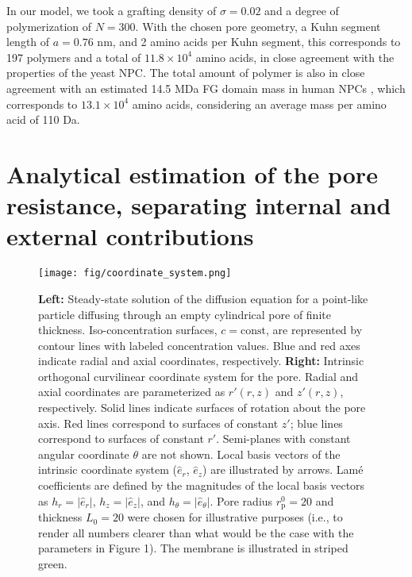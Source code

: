 \documentclass[10pt, a4paper, twocolumn]{article}
\begin{document}
In our model, we took a grafting density of $\sigma = 0.02$ and a degree of polymerization of $N = 300$.
With the chosen pore geometry, a Kuhn segment length of $a = 0.76$ nm, and 2 amino acids per Kuhn segment, this corresponds to 197 polymers and a total of $11.8 \times 10^4$ amino acids, in close agreement with the properties of the yeast NPC.
The total amount of polymer is also in close agreement with an estimated 14.5 MDa FG domain mass in human NPCs \cite{Ng2023}, which corresponds to $13.1 \times 10^4$ amino acids, considering an average mass per amino acid of 110 Da.


\pagebreak
\section{Analytical estimation of the pore resistance, separating internal and external contributions}

\begin{figure*}[h]
    \centering
    \texttt{[image: fig/coordinate\_system.png]}
    \caption{%
        \textbf{Left:}
        Steady-state solution of the diffusion equation for a point-like particle diffusing through an empty cylindrical pore of finite thickness.
        Iso-concentration surfaces, $c = \text{const}$, are represented by contour lines with labeled concentration values.
        Blue and red axes indicate radial and axial coordinates, respectively.
        \textbf{Right:}
        Intrinsic orthogonal curvilinear coordinate system for the pore.
        Radial and axial coordinates are parameterized as $r'(r,z)$ and $z'(r,z)$, respectively.
        Solid lines indicate surfaces of rotation about the pore axis.
        Red lines correspond to surfaces of constant $z'$; blue lines correspond to surfaces of constant $r'$.
        Semi-planes with constant angular coordinate $\theta$ are not shown.
        Local basis vectors of the intrinsic coordinate system ($\hat{e}_r$, $\hat{e}_z$) are illustrated by arrows.
        Lamé coefficients are defined by the magnitudes of the local basis vectors as $h_r = |\hat{e}_r|$, $h_z = |\hat{e}_z|$, and $h_{\theta} = |\hat{e}_{\theta}|$.
        Pore radius $r_{\text{p}}^{0} = 20$ and thickness $L_{0} = 20$ were chosen for illustrative purposes (i.e., to render all numbers clearer than what would be the case with the parameters in Figure 1).
        The membrane is illustrated in striped green.
    }
    \label{fig:empty_pore_solution}    
\end{figure*}
\end{document}
